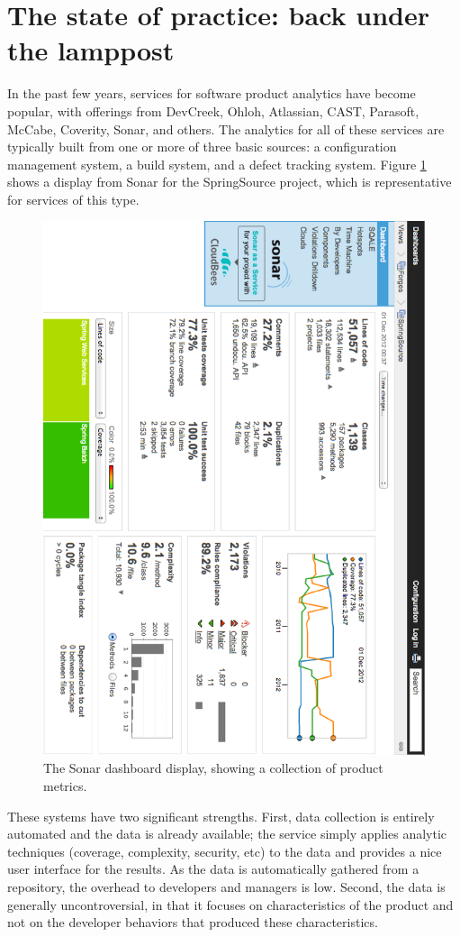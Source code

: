\documentclass[]{article}
\begin{document}
\section{The state of practice: back under the lamppost}

In the past few years, services for software product analytics have become popular, with
offerings from DevCreek, Ohloh, Atlassian, CAST, Parasoft, McCabe, Coverity, Sonar, and
others. The analytics for all of these services are typically built from one or more of
three basic sources: a configuration management system, a build system, and a defect
tracking system.  Figure \ref{fig:sonar} shows a display from Sonar for the SpringSource
project, which is representative for services of this type.

\begin{figure}[!tb]
\centering
\includegraphics[width=0.50\columnwidth, angle=90]{sonar-dashboard.eps}
\caption{The Sonar dashboard display, showing a collection of product metrics.}
\label{fig:sonar}
\end{figure}

These systems have two significant strengths.  First, data collection is entirely
automated and the data is already available; the service simply applies analytic
techniques (coverage, complexity, security, etc) to the data and provides a nice user
interface for the results. As the data is automatically gathered from a repository, the
overhead to developers and managers is low. Second, the data is generally
uncontroversial, in that it focuses on characteristics of the product and
not on the developer behaviors that produced these characteristics.
\end{document}
